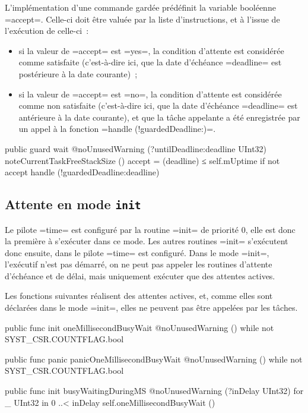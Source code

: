 L'implémentation d'une commande gardée prédéfinit la variable booléenne \omnibus=accept=. Celle-ci doit être valuée par la liste d'instructions, et à l'issue de l'exécution de celle-ci~:
\begin{itemize}
  \item si la valeur de \omnibus=accept= est \omnibus=yes=, la condition d'attente est considérée comme satisfaite (c'est-à-dire ici, que la date d'échéance \omnibus=deadline= est postérieure à la date courante)~;
  \item si la valeur de \omnibus=accept= est \omnibus=no=, la condition d'attente est considérée comme non satisfaite (c'est-à-dire ici, que la date d'échéance \omnibus=deadline= est antérieure à la date courante), et que la tâche appelante a été enregistrée par un appel à la fonction \omnibus=handle (!guardedDeadline:)=.
\end{itemize}

\begin{OMNIBUS}
public guard wait @noUnusedWarning (?untilDeadline:deadline UInt32) {
  noteCurrentTaskFreeStackSize ()
  accept = (deadline) ≤ self.mUptime
  if not accept {
    handle (!guardedDeadline:deadline)
  }
}
\end{OMNIBUS}

\subsection{Attente en mode \texttt{init}}

Le pilote \omnibus=time= est configuré par la routine \omnibus=init= de priorité $0$, elle est donc la première à s'exécuter dans ce mode. Les autres routines \omnibus=init= s'exécutent donc ensuite, dans le pilote \omnibus=time= est configuré. Dans le mode \omnibus=init=, l'exécutif n'est pas démarré, on ne peut pas appeler les routines d'attente d'échéance et de délai, mais uniquement exécuter que des attentes actives.

Les fonctions suivantes réalisent des attentes actives, et, comme elles sont déclarées dans le mode \omnibus=init=, elles ne peuvent pas être appelées par les tâches.

\begin{OMNIBUS}
public func init oneMillisecondBusyWait @noUnusedWarning () {
  while not SYST_CSR.COUNTFLAG.bool {}
}

public func panic panicOneMillisecondBusyWait @noUnusedWarning () {
  while not SYST_CSR.COUNTFLAG.bool {}
}

public func init busyWaitingDuringMS @noUnusedWarning (?inDelay UInt32) {
  for _ UInt32 in 0 ..< inDelay {
    self.oneMillisecondBusyWait ()
  }
}
\end{OMNIBUS}



